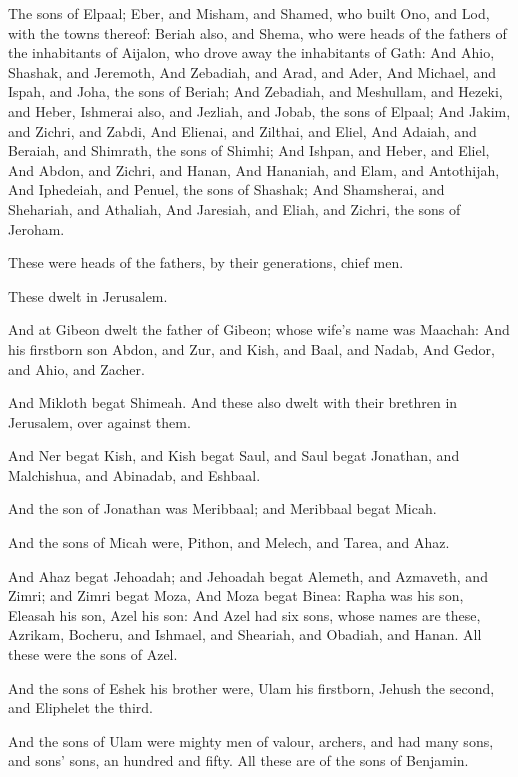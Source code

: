 \Verse The sons of Elpaal; Eber, and Misham, and Shamed, who built Ono, and Lod, with the towns thereof: \Verse Beriah also, and Shema, who were heads of the fathers of the inhabitants of Aijalon, who drove away the inhabitants of Gath: \Verse And Ahio, Shashak, and Jeremoth, \Verse And Zebadiah, and Arad, and Ader, \Verse And Michael, and Ispah, and Joha, the sons of Beriah; \Verse And Zebadiah, and Meshullam, and Hezeki, and Heber, \Verse Ishmerai also, and Jezliah, and Jobab, the sons of Elpaal; \Verse And Jakim, and Zichri, and Zabdi, \Verse And Elienai, and Zilthai, and Eliel, \Verse And Adaiah, and Beraiah, and Shimrath, the sons of Shimhi; \Verse And Ishpan, and Heber, and Eliel, \Verse And Abdon, and Zichri, and Hanan, \Verse And Hananiah, and Elam, and Antothijah, \Verse And Iphedeiah, and Penuel, the sons of Shashak; \Verse And Shamsherai, and Shehariah, and Athaliah, \Verse And Jaresiah, and Eliah, and Zichri, the sons of Jeroham.

\Verse These were heads of the fathers, by their generations, chief men.

These dwelt in Jerusalem.

\Verse And at Gibeon dwelt the father of Gibeon; whose wife's name was Maachah: \Verse And his firstborn son Abdon, and Zur, and Kish, and Baal, and Nadab, \Verse And Gedor, and Ahio, and Zacher.

\Verse And Mikloth begat Shimeah. And these also dwelt with their brethren in Jerusalem, over against them.

\Verse And Ner begat Kish, and Kish begat Saul, and Saul begat Jonathan, and Malchishua, and Abinadab, and Eshbaal.

\Verse And the son of Jonathan was Meribbaal; and Meribbaal begat Micah.

\Verse And the sons of Micah were, Pithon, and Melech, and Tarea, and Ahaz.

\Verse And Ahaz begat Jehoadah; and Jehoadah begat Alemeth, and Azmaveth, and Zimri; and Zimri begat Moza, \Verse And Moza begat Binea: Rapha was his son, Eleasah his son, Azel his son: \Verse And Azel had six sons, whose names are these, Azrikam, Bocheru, and Ishmael, and Sheariah, and Obadiah, and Hanan. All these were the sons of Azel.

\Verse And the sons of Eshek his brother were, Ulam his firstborn, Jehush the second, and Eliphelet the third.

\Verse And the sons of Ulam were mighty men of valour, archers, and had many sons, and sons' sons, an hundred and fifty. All these are of the sons of Benjamin.


